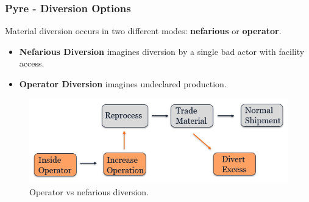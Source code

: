 \begin{frame}
\frametitle{Pyre - Diversion Options}
Material diversion occurs in two different modes: \textbf{nefarious} or \textbf{operator}.
\begin{itemize}
	\item \textbf{Nefarious Diversion} imagines diversion by a single bad actor with facility access.
	\item \textbf{Operator Diversion} imagines undeclared production.
\end{itemize}
\begin{figure}
	\includegraphics[width=0.7\linewidth]{./images/westphal-diversion}
	\caption{Operator vs nefarious diversion.}
	\label{fig:diversion}
\end{figure}
\end{frame}

